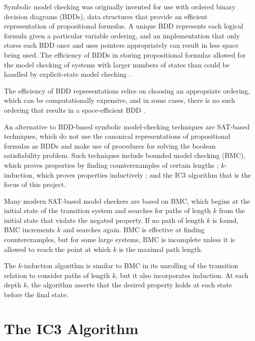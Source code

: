 \documentclass[12pt,a4paper,twoside,openright]{report}
\begin{document}
Symbolic model checking was originally invented for use with ordered
binary decision diagrams (BDDs), data structures that provide an efficient
representation of propositional formulas. A unique BDD represents each logical
formula given a particular variable ordering, and an implementation that
only stores each BDD once and uses pointers appropriately can result in
less space being used.
The efficiency of BDDs in storing propositional formulas allowed for the model
checking of systems with larger numbers of states than could be handled
by explicit-state model checking \cite{mcmillan92}.

The efficiency of BDD representations relies on choosing an appropriate
ordering, which can be computationally expensive, and in some cases,
there is no such ordering that results in a space-efficient BDD
\cite{biere99a}.

An alternative to BDD-based symbolic model-checking techniques are SAT-based
techniques, which do not use the canonical representations of propositional
formulas as BDDs and make use of procedures for solving the boolean
satisfiability problem.
Such techniques include bounded model checking (BMC),
which proves properties by finding counterexamples of certain lengths
\cite{biere99a};
$k$-induction, which proves properties inductively \cite{sheeran00};
and the IC3 algorithm that is the focus of this project.

Many modern SAT-based model checkers are based on BMC, which begins at the
initial state of the transition system and searches for paths of length
$k$ from the initial state that violate the negated property.
If no path of length $k$ is found, BMC increments $k$ and searches again.
BMC is effective at finding counterexamples, but for some large systems,
BMC is incomplete unless it is allowed to reach the point at which $k$ is
the maximal path length.

The $k$-induction algorithm is similar to BMC in its unrolling of the
transition relation to consider paths of length $k$, but it also
incorporates induction. At each depth $k$, the algorithm asserts that the
desired property holds at each state before the final state.


\section{The IC3 Algorithm}
\end{document}
